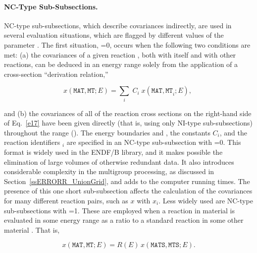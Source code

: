 \paragraph{NC-Type Sub-Subsections.} NC-type sub-subsections, which
describe covariances indirectly, are used in several evaluation
situations, which are flagged by different values of the parameter
.  The first situation, =0, occurs when the
following two conditions are met:  (a) the covariances of a given
reaction , both with itself and with other reactions, can be
deduced in an energy range  solely from the application
of a cross-section ``derivation relation,''

\begin{equation}
x({\mathtt{MAT,MT}};E) = \sum_{i} \; C_i \; x({\mathtt{MAT,MT}}_i; E),\;
\label{e17}
\end{equation}

\noindent
and (b) the covariances of all of the reaction cross sections on the
right-hand side of Eq.~\ref{e17} have been given directly (that is, using
only NI-type sub-subsections) throughout the range ().
The energy boundaries  and , the constants $C_i$,
and the reaction identifiers $_i$ are specified in an NC-type
sub-subsection with =0.  This format is widely used in the
ENDF/B library, and it makes possible the elimination of large volumes
of otherwise redundant data.  It also introduces considerable
complexity in the multigroup processing, as discussed in
Section~\ref{ssERRORR_UnionGrid}, and
adds to the computer running times. The presence of this one short
sub-subsection affects the calculation of the covariances for many
different reaction pairs, such as $x$ with
$x$$_i$\cword{)}.  Less widely used are NC-type
sub-subsections with =1.  These are employed when a reaction
 in material  is evaluated in some energy range
 as a ratio to a standard reaction  in some
other material .  That is,

\begin{equation}
x({\mathtt{MAT,MT}};E) = R(E)\, x ({\mathtt{MATS,MTS}};E).
\label{e18}
\end{equation}

